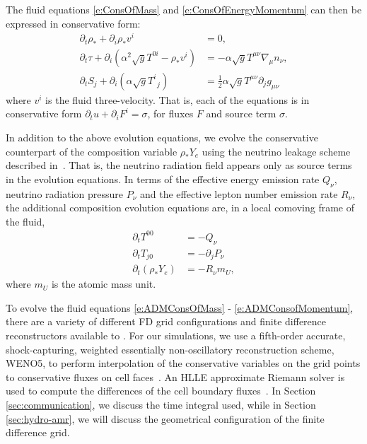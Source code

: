 The fluid equations \ref{e:ConsOfMass} and \ref{e:ConsOfEnergyMomentum} can then be expressed in conservative form:
\begin{align}
\label{e:ADMConsOfMass}
\partial_t \rho_* + \partial_i \rho_* v^i 
	&= 0, \\
\label{e:ADMConsOfEnergy}
\partial_t \tau + \partial_i \left(\alpha^2 \sqrt{g} T^{0 i} - \rho_*v^i\right) 
	&= -\alpha \sqrt{g} T^{\mu \nu} \nabla_\mu n_\nu, \\
\label{e:ADMConsofMomentum}
\partial_t S_j + \partial_i\left(\alpha \sqrt{g}T^i_{\,\,\,j}\right) 
	&= \frac{1}{2} \alpha \sqrt{g} T^{\mu \nu} \partial_j g_{\mu \nu}
\end{align}
where $v^i$ is the fluid three-velocity.  That is, each of the equations is in conservative form $\partial_t u  + \partial_i F^i = \sigma$, for  fluxes $F$ and  source term $\sigma$.  

In addition to the above evolution equations, we evolve the conservative counterpart of the composition variable $\rho_* Y_e$ using the neutrino leakage scheme described in~\cite{Deaton2013}.
That is, the neutrino radiation field appears only as source terms in the evolution equations.
In terms of the effective energy emission rate $Q_\nu$, neutrino radiation pressure $P_\nu$ and the effective lepton number emission rate $R_\nu$, the additional composition evolution equations are, in a local comoving frame of the fluid, 
\begin{align}
\partial_t T^{00} &= -Q_\nu \\
\partial_t T_{j0} &= - \partial_j P_\nu \\
\partial_t (\rho_* Y_e) &= -R_\nu m_U ,
\end{align}
where $m_U$ is the atomic mass unit.

To evolve the fluid equations \ref{e:ADMConsOfMass} - \ref{e:ADMConsofMomentum}, there are a variety of different FD grid configurations and finite difference reconstructors available to \SpEC.
For our simulations, we use a fifth-order accurate, shock-capturing, weighted essentially non-oscillatory reconstruction scheme, WENO5, to perform interpolation of the conservative variables on the grid points to conservative fluxes on cell faces~\cite{Liu1994200,Jiang1996202}.
An HLLE approximate Riemann solver is used to compute the differences of the cell boundary fluxes~\cite{HLL}.
In Section \ref{sec:communication}, we discuss the time integral used, while in Section \ref{sec:hydro-amr}, we will discuss the geometrical configuration of the finite difference grid.

